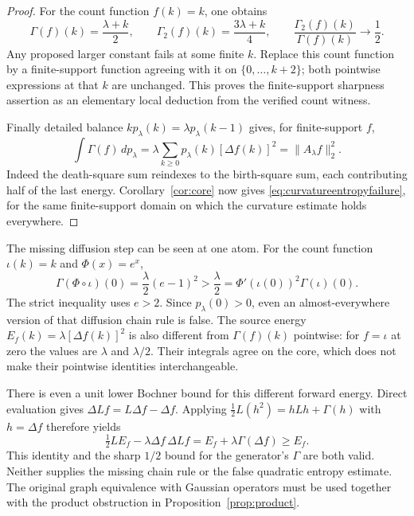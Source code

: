 \documentclass[11pt]{article}
\begin{document}
\begin{proof}
For the count function $f(k)=k$, one obtains
\[
 \Gamma(f)(k)=\frac{\lambda+k}{2},\qquad
 \Gamma_2(f)(k)=\frac{3\lambda+k}{4},\qquad
 \frac{\Gamma_2(f)(k)}{\Gamma(f)(k)}\longrightarrow\frac12.
\]
Any proposed larger constant fails at some finite $k$. Replace this
count function by a finite-support function agreeing with it on
$\{0,\ldots,k+2\}$; both pointwise expressions at that $k$ are unchanged.
This proves the finite-support sharpness assertion as an elementary
local deduction from the verified count witness.

Finally detailed balance $k p_\lambda(k)=\lambda p_\lambda(k-1)$
gives, for finite-support $f$,
\[
 \int\Gamma(f)\,dp_\lambda
 =\lambda\sum_{k\geq0}p_\lambda(k)[\Delta f(k)]^2
 =\|A_\lambda f\|_2^2.
\]
Indeed the death-square sum reindexes to the birth-square sum, each
contributing half of the last energy. Corollary~\ref{cor:core} now gives
\eqref{eq:curvatureentropyfailure}, for the same finite-support domain
on which the curvature estimate holds everywhere.
\end{proof}

The missing diffusion step can be seen at one atom. For the count
function $\iota(k)=k$ and $\Phi(x)=e^x$,
\[
 \Gamma(\Phi\circ\iota)(0)=\frac\lambda2(e-1)^2
 >\frac\lambda2=\Phi'(\iota(0))^2\Gamma(\iota)(0).
\]
The strict inequality uses $e>2$. Since $p_\lambda(0)>0$, even an
almost-everywhere version of that diffusion chain rule is false.
The source energy $E_f(k)=\lambda[\Delta f(k)]^2$ is also different
from $\Gamma(f)(k)$ pointwise: for $f=\iota$ at zero the values are
$\lambda$ and $\lambda/2$. Their integrals agree on the core, which
does not make their pointwise identities interchangeable.

There is even a unit lower Bochner bound for this different forward
energy. Direct evaluation gives
$\Delta Lf=L\Delta f-\Delta f$. Applying
$\tfrac12 L(h^2)=hLh+\Gamma(h)$ with $h=\Delta f$ therefore yields
\[
 \tfrac12 L E_f-\lambda\Delta f\,\Delta Lf
 =E_f+\lambda\Gamma(\Delta f)\geq E_f.
\]
This identity and the sharp $1/2$ bound for the generator's
$\Gamma$ are both valid. Neither supplies the missing chain rule or
the false quadratic entropy estimate. The original graph equivalence
with Gaussian operators must be used together with the product
obstruction in Proposition~\ref{prop:product}.
\end{document}
